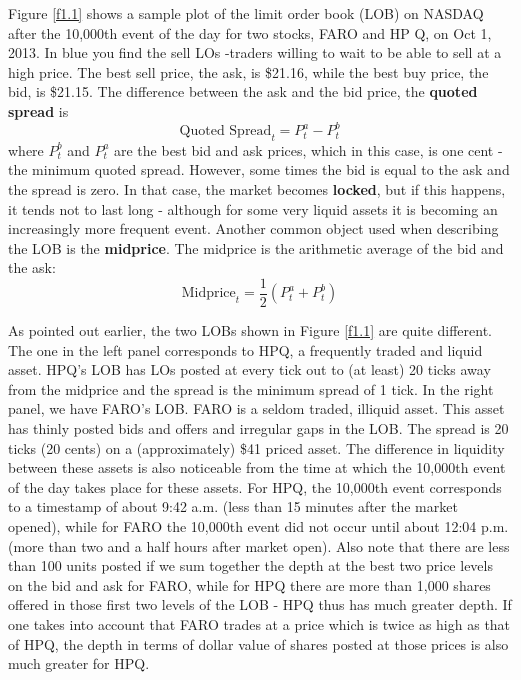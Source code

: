 \documentclass[11pt]{article}
\begin{document}
Figure \ref{f1.1} shows a sample plot of the limit order book (LOB) on NASDAQ after the 10,000th event
of the day for two stocks, FARO and HP Q, on Oct 1, 2013. In blue you find the sell LOs -traders
willing to wait to be able to sell at a high price. The best sell price, the ask, is \$21.16, while the
best buy price, the bid, is \$21.15. The difference between the ask and the bid price, the \textbf{quoted
spread} is
\begin{equation*}
\text{Quoted Spread}_t=P_t^a-P_t^b
\end{equation*}
where \(P_t^b\) and \(P_t^a\) are the best bid  and ask prices, which in this case, is one cent - the
minimum quoted spread. However, some times the bid is equal to the ask and the spread is zero. In that
case, the market becomes \textbf{locked}, but if this happens, it tends not to last long - although for some
very liquid assets it is becoming an increasingly more frequent event. Another common object used when
describing the LOB is the \textbf{midprice}. The midprice is the arithmetic average of the bid and the ask:
\begin{equation*}
\text{Midprice}_t=\frac{1}{2}(P_t^a+P^b_t)
\end{equation*}

As pointed out earlier, the two LOBs shown in Figure \ref{f1.1} are quite different. The one in the left
panel corresponds to HPQ, a frequently traded and liquid asset. HPQ's LOB has LOs posted at every tick
out to (at least) 20 ticks away  from the midprice and the spread is the minimum spread of 1 tick. In
the right panel, we have FARO's LOB. FARO is a seldom traded, illiquid asset. This asset has thinly
posted bids and offers and irregular gaps in the LOB. The spread is 20 ticks (20 cents) on a
(approximately) \$41 priced asset. The difference in liquidity between these assets is also noticeable
from the time at which the 10,000th event of the day takes place for these assets. For HPQ, the
10,000th event corresponds to a timestamp of about 9:42 a.m. (less than 15 minutes after the market
opened), while for FARO the 10,000th event did not occur until about 12:04 p.m. (more than two and a
half hours after market open). Also note that there are less than 100 units posted if we sum together
the depth at the best two price levels on the bid and ask for FARO, while for HPQ there are more than
1,000 shares offered in those first two levels of the LOB - HPQ thus has much greater depth. If one
takes into account that FARO trades at a price which is twice as high as that of HPQ, the depth in
terms of dollar value of shares posted at those prices is also much greater for HPQ.
\end{document}
